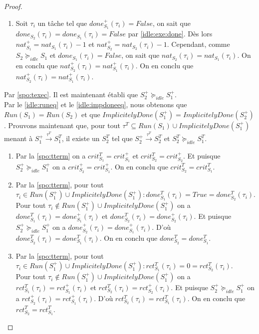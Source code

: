 \documentclass[12pt,a4paper,oneside]{book}
\theoremstyle{break}
\theoremstyle{breakplain}
\begin{document}
\begin{proof}
\begin{enumerate}
\item Soit $\tau_i$ un tâche tel que $done_{S_1}^+(\tau_i) = False$, on sait que $done_{S_2}(\tau_i) = done_{S_1}(\tau_i) = False$ par \autoref{idle:exe:done}. Dès lors $ nat_{S_1}^+ = nat_{S_1}(\tau_i)-1$ et $nat_{S_2}^+ = nat_{S_2}(\tau_i)-1$. Cependant, comme $S_2 \succeq_{idle} S_1$ et $done_{S_1}(\tau_i) = False$, on sait que $nat_{S_2}(\tau_i) = nat_{S_1}(\tau_i)$. On en conclu que $nat_{S_2}^+(\tau_i) = nat_{S_1}^+(\tau_i)$. On en conclu que $nat_{S_2}^+(\tau_i) = nat_{S_1}^+(\tau_i)$.
\end{enumerate}


Par \autoref{spo:texec}. Il est maintenant établi que $S^+_2 \succeq_{idle} S^+_1$.\\

Par le \autoref{idle:runeq} et le \autoref{idle:impdoneeq}, nous obtenons que $Run(S_1) = Run(S_2)$ et que $ImplicitelyDone(S^+_1) = ImplicitelyDone(S_2^+)$.
Prouvons maintenant que, pour tout $\tau^T\subseteq Run(S_1) \cup ImplicitelyDone(S_1^+)$ menant à $S_1^+ \xrightarrow{\tau^T} S_1^T$, il existe un $S_2^T$ tel que $S_2^+ \xrightarrow{\tau^T} S_2^T$ et $S_2^T \succeq_{idle} S_1^T$.
\begin{enumerate}

\item Par la \autoref{spo:tterm} on a $crit_{S_1}^T = crit_{S_1}^+$ et $crit_{S_2}^T = crit_{S_2}^+$. Et puisque $S^+_2 \succeq_{idle} S^+_1$ on a $crit_{S_2}^+= crit_{S_1}^+$. On en conclu que $crit_{S_2}^T= crit_{S_1}^T$.

\item \label{idle:term:done} Par la \autoref{spo:tterm}, pour tout $\tau_i \in Run(S_1^+) \cup ImplicitelyDone(S_1^+) : done_{S_1}^T(\tau_i) = True = done_{S_2}^T(\tau_i)$.\\ Pour tout $\tau_i \notin Run(S_1^+) \cup ImplicitelyDone(S_1^+)$ on a $done_{S_1}^T(\tau_i) = done_{S_1}^+(\tau_i)$ et $done_{S_2}^T(\tau_i) = done_{S_2}^+(\tau_i)$. Et puisque $S^+_2 \succeq_{idle} S^+_1$ on a $done_{S_2}^+(\tau_i)= done_{S_1}^+(\tau_i)$. D'où $done_{S_2}^T(\tau_i) = done_{S_1}^T(\tau_i)$. On en conclu que $done_{S_2}^T = done_{S_1}^T$.

\item Par la \autoref{spo:tterm}, pour tout $\tau_i \in Run(S_1^+) \cup ImplicitelyDone(S_1^+) : rct_{S_1}^T(\tau_i) = 0 = rct_{S_2}^T(\tau_i)$.\\ Pour tout $\tau_i \notin Run(S_1^+) \cup ImplicitelyDone(S_1^+)$ on a $rct_{S_1}^T(\tau_i) = rct_{S_1}^+(\tau_i)$ et $rct_{S_2}^T(\tau_i) = rct_{S_2}^+(\tau_i)$. Et puisque $S^+_2 \succeq_{idle} S^+_1$ on a $rct_{S_2}^+(\tau_i)= rct_{S_1}^+(\tau_i)$. D'où $rct_{S_2}^T(\tau_i) = rct_{S_1}^T(\tau_i)$. On en conclu que $rct_{S_2}^T = rct_{S_1}^T$.


\end{enumerate}
\end{proof}
\end{document}
